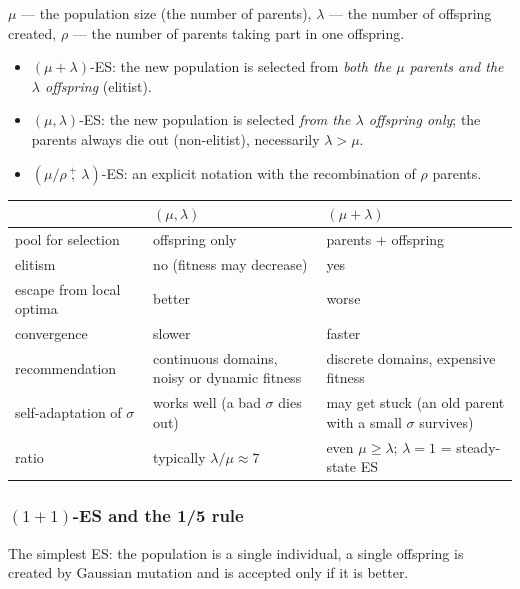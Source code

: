 \documentclass[11pt,a4paper]{article}
\theoremstyle{definition}
\begin{document}
\begin{defbox}[ES notation]
$\mu$ --- the population size (the number of parents), $\lambda$ --- the number
of offspring created, $\rho$ --- the number of parents taking part in one
offspring.
\begin{itemize}
\item $(\mu + \lambda)$-ES: the new population is selected from \emph{both the
  $\mu$ parents and the $\lambda$ offspring} (elitist).
\item $(\mu, \lambda)$-ES: the new population is selected \emph{from the
  $\lambda$ offspring only}; the parents always die out (non-elitist),
  necessarily $\lambda > \mu$.
\item $(\mu/\rho \,\overset{+}{,}\, \lambda)$-ES: an explicit notation with the
  recombination of $\rho$ parents.
\end{itemize}
\end{defbox}

\begin{center}
\begin{tabular}{@{}p{4cm}p{5.5cm}p{5.5cm}@{}}
\toprule
 & $(\mu,\lambda)$ & $(\mu+\lambda)$ \\
\midrule
pool for selection & offspring only & parents + offspring \\
elitism & no (fitness may decrease) & yes \\
escape from local optima & better & worse \\
convergence & slower & faster \\
recommendation & continuous domains, noisy or dynamic fitness & discrete
  domains, expensive fitness \\
self-adaptation of $\sigma$ & works well (a bad $\sigma$ dies out) & may get
  stuck (an old parent with a small $\sigma$ survives) \\
ratio & typically $\lambda/\mu \approx 7$ & even $\mu \ge \lambda$;
  $\lambda = 1$ = steady-state ES \\
\bottomrule
\end{tabular}
\end{center}

\subsubsection{$(1+1)$-ES and the 1/5 rule}

The simplest ES: the population is a single individual, a single offspring is
created by Gaussian mutation and is accepted only if it is better.
\end{document}
